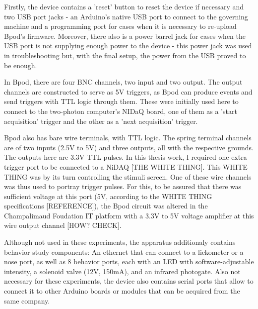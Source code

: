 Firstly, the device contains a 'reset' button to reset the device if necessary and two USB port jacks - an Arduino's native USB port to connect to the governing machine and a programming port for cases when it is necessary to re-upload Bpod's firmware. Moreover, there also is a power barrel jack for cases when the USB port is not supplying enough power to the device - this power jack was used in troubleshooting but, with the final setup, the power from the USB proved to be enough.


In Bpod, there are four BNC channels, two input and two output. The output channels are constructed to serve as 5V triggers, as Bpod can produce events and send triggers with TTL logic through them. These were initially used here to connect to the two-photon computer's NIDaQ board, one of them as a 'start acquisition' trigger and the other as a 'next acquisition' trigger. 

Bpod also has bare wire terminals, with TTL logic. The spring terminal channels are of two inputs (2.5V to 5V) and three outputs, all with the respective grounds. The outputs here are 3.3V TTL pulses. In this thesis work, I required one extra trigger port to be connected to a NiDAQ [THE WHITE THING]. This WHITE THING was by its turn controlling the stimuli screen. One of these wire channels was thus used to portray trigger pulses. For this, to be assured that there was sufficient voltage at this port (5V, according to the WHITE THING specifications [REFERENCE]), the Bpod circuit was altered in the Champalimaud Foudation IT platform with a 3.3V to 5V voltage amplifier at this wire output channel [HOW? CHECK].

Although not used in these experiments, the apparatus additionaly contains behavior study components: An ethernet that can connect to a lickometer or a nose port, as well as 8 behavior ports, each with an LED with software-adjustable intensity, a solenoid valve (12V, 150mA), and an infrared photogate. Also not necessary for these experiments, the device also contains serial ports that allow to connect it to other Arduino boards or modules that can be acquired from the same company.




